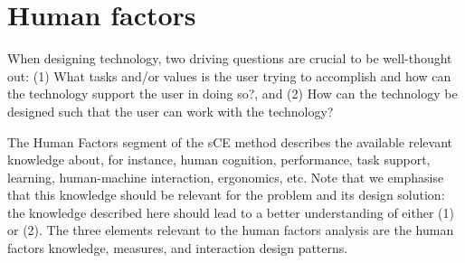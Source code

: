 \section{Human factors}
\label{sec:human-factors}
When designing technology, two driving questions are crucial to be well-thought out: (1) What tasks and/or values is the user trying to accomplish and how can the technology support the user in doing so?, and (2) How can the technology be designed such that the user can work with the technology?

The Human Factors segment of the sCE method describes the available relevant knowledge about, for instance, human cognition, performance, task support, learning, human-machine interaction, ergonomics, etc. Note that we emphasise that this knowledge should be relevant for the problem and its design solution: the knowledge described here should lead to a better understanding of either (1) or (2). The three elements relevant to the human factors analysis are the human factors knowledge, measures, and interaction design patterns.

